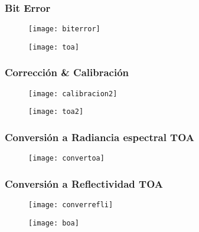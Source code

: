 \documentclass[14pt]{beamer}
\begin{document}
\begin{frame}
\frametitle{Bit Error}
\scriptsize{}
  \begin{figure}
    \centering
    \texttt{[image: biterror]}
  \end{figure}
\end{frame}
\begin{frame}
\scriptsize{}
  \begin{figure}
    \centering
    \texttt{[image: toa]}
     \end{figure}
\end{frame}
\begin{frame}
\frametitle{Corrección \& Calibración}
\scriptsize{}
  \begin{figure}
    \centering
    \texttt{[image: calibracion2]}
     \end{figure}
\end{frame}
\begin{frame}
\scriptsize{}
  \begin{figure}
    \centering
    \texttt{[image: toa2]}
     \end{figure}
\end{frame}
\begin{frame}
\frametitle{Conversión a Radiancia espectral TOA}
\scriptsize{}
  \begin{figure}
    \centering
    \texttt{[image: convertoa]}
  \end{figure}
\end{frame}
\begin{frame}
\frametitle{Conversión a Reflectividad TOA}
\scriptsize{}
  \begin{figure}
    \centering
    \texttt{[image: converrefli]}
  \end{figure}
\end{frame}
\begin{frame}
\scriptsize{}
  \begin{figure}
    \centering
    \texttt{[image: boa]}
  \end{figure}
\end{frame}
\end{document}

